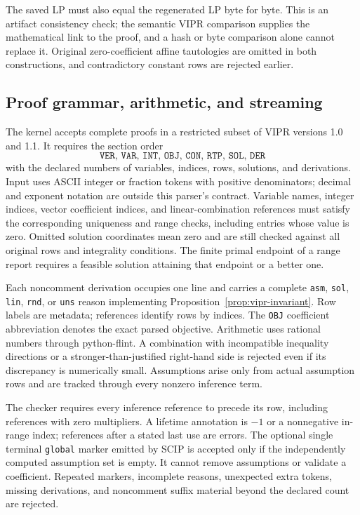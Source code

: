 The saved LP must also equal the regenerated LP byte for byte. This is an artifact consistency check; the semantic VIPR comparison supplies the mathematical link to the proof, and a hash or byte comparison alone cannot replace it. Original zero-coefficient affine tautologies are omitted in both constructions, and contradictory constant rows are rejected earlier.

\subsection{Proof grammar, arithmetic, and streaming}
\label{sec:proof-implementation}
The kernel accepts complete proofs in a restricted subset of VIPR versions 1.0 and 1.1. It requires the section order
\[
 \texttt{VER, VAR, INT, OBJ, CON, RTP, SOL, DER}
\]
with the declared numbers of variables, indices, rows, solutions, and derivations. Input uses ASCII integer or fraction tokens with positive denominators; decimal and exponent notation are outside this parser's contract. Variable names, integer indices, vector coefficient indices, and linear-combination references must satisfy the corresponding uniqueness and range checks, including entries whose value is zero. Omitted solution coordinates mean zero and are still checked against all original rows and integrality conditions. The finite primal endpoint of a range report requires a feasible solution attaining that endpoint or a better one.

Each noncomment derivation occupies one line and carries a complete \texttt{asm}, \texttt{sol}, \texttt{lin}, \texttt{rnd}, or \texttt{uns} reason implementing Proposition~\ref{prop:vipr-invariant}. Row labels are metadata; references identify rows by indices. The \texttt{OBJ} coefficient abbreviation denotes the exact parsed objective. Arithmetic uses rational numbers through python-flint. A combination with incompatible inequality directions or a stronger-than-justified right-hand side is rejected even if its discrepancy is numerically small. Assumptions arise only from actual assumption rows and are tracked through every nonzero inference term.

The checker requires every inference reference to precede its row, including references with zero multipliers. A lifetime annotation is $-1$ or a nonnegative in-range index; references after a stated last use are errors. The optional single terminal \texttt{global} marker emitted by SCIP is accepted only if the independently computed assumption set is empty. It cannot remove assumptions or validate a coefficient. Repeated markers, incomplete reasons, unexpected extra tokens, missing derivations, and noncomment suffix material beyond the declared count are rejected.

